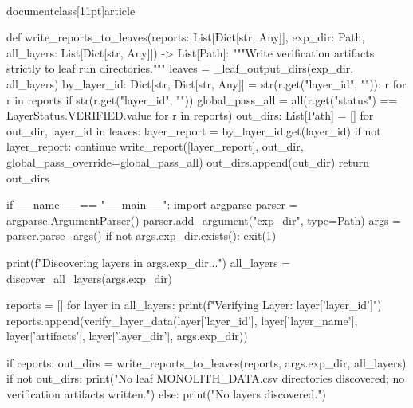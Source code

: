 \\documentclass[11pt]{article}
\begin{document}
\begin{CodeBlock}
def write_reports_to_leaves(reports: List[Dict[str, Any]], exp_dir: Path, all_layers: List[Dict[str, Any]]) -> List[Path]:
    """Write verification artifacts strictly to leaf run directories."""
    leaves = _leaf_output_dirs(exp_dir, all_layers)
    by_layer_id: Dict[str, Dict[str, Any]] = {
        str(r.get("layer_id", "")): r for r in reports if str(r.get("layer_id", ""))
    }
    global_pass_all = all(r.get("status") == LayerStatus.VERIFIED.value for r in reports)
    out_dirs: List[Path] = []
    for out_dir, layer_id in leaves:
        layer_report = by_layer_id.get(layer_id)
        if not layer_report:
            continue
        write_report([layer_report], out_dir, global_pass_override=global_pass_all)
        out_dirs.append(out_dir)
    return out_dirs

if __name__ == "__main__":
    import argparse
    parser = argparse.ArgumentParser()
    parser.add_argument("exp_dir", type=Path)
    args = parser.parse_args()
    if not args.exp_dir.exists(): exit(1)
    
    print(f"Discovering layers in {args.exp_dir}...")
    all_layers = discover_all_layers(args.exp_dir)
    
    reports = []
    for layer in all_layers:
        print(f"Verifying Layer: {layer['layer_id']}")
        reports.append(verify_layer_data(layer['layer_id'], layer['layer_name'], layer['artifacts'], layer['layer_dir'], args.exp_dir))
            
    if reports:
        out_dirs = write_reports_to_leaves(reports, args.exp_dir, all_layers)
        if not out_dirs:
            print("No leaf MONOLITH_DATA.csv directories discovered; no verification artifacts written.")
    else:
        print("No layers discovered.")

\end{CodeBlock}
\end{document}
